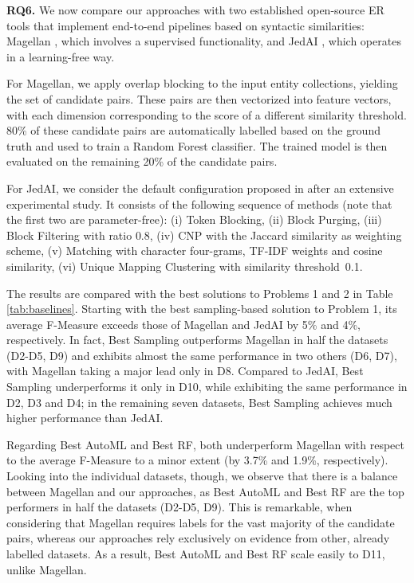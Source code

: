 {
\textbf{RQ6.} We now compare our approaches with two established open-source ER tools that implement end-to-end pipelines based on syntactic similarities: Magellan \cite{DBLP:journals/pvldb/KondaDCDABLPZNP16}, which involves a supervised functionality, and JedAI \cite{DBLP:journals/is/PapadakisMGSTGB20}, which operates in a learning-free way. 

For Magellan, we apply overlap blocking to the input entity collections, yielding the set of candidate pairs. These pairs are then vectorized into feature vectors, with each dimension corresponding to the score of a different similarity threshold. 80\% of these candidate pairs are automatically labelled based on the ground truth and used to train a Random Forest classifier. The trained model is then evaluated on the remaining 20\% of the candidate pairs.

For JedAI, we consider the default configuration proposed in \cite{DBLP:journals/is/PapadakisMGSTGB20} after an extensive experimental study. It consists of the following sequence of methods (note that the first two are parameter-free): (i) Token Blocking, (ii) Block Purging, (iii) Block Filtering with ratio $0.8$, (iv) CNP with the Jaccard similarity as weighting scheme, (v) Matching with character four-grams, TF-IDF weights and cosine similarity, (vi) Unique Mapping Clustering with similarity threshold~0.1.

The results are compared with the best solutions to Problems 1 and 2 in Table \ref{tab:baselines}. Starting with the best sampling-based solution to Problem 1, 
its average F-Measure exceeds those of Magellan and JedAI by 5\% and 4\%, respectively. In fact, Best Sampling outperforms Magellan in half the datasets (D2-D5, D9) and exhibits almost the same performance in two others (D6, D7), with Magellan taking a major lead only in D8. Compared to JedAI, Best Sampling underperforms it only in D10, while exhibiting the same performance in D2, D3 and D4; in the remaining seven datasets, Best Sampling achieves much higher performance than JedAI.

Regarding Best AutoML and Best RF, both underperform Magellan with respect to the average F-Measure to a minor extent (by 3.7\% and 1.9\%, respectively). Looking into the individual datasets, though, we observe that there is a balance between Magellan and our approaches, as Best AutoML and Best RF are the top performers in half the datasets (D2-D5, D9). This is remarkable, when considering that Magellan requires labels for the vast majority of the candidate pairs, whereas our approaches rely exclusively on evidence from other, already labelled datasets. As a result, Best AutoML and Best RF scale easily to D11, unlike Magellan. 

}
